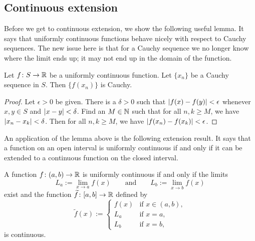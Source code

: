 \subsection{Continuous extension}

Before we get to continuous extension, we show the following useful lemma.
It says that uniformly continuous functions behave nicely with respect
to Cauchy sequences.  The new issue here is that for a Cauchy sequence
we no longer know where the limit ends up; it may not end up in the domain
of the function.

\begin{lemma} \label{unifcauchycauchy:lemma}
Let $f \colon S \to {\mathbb{R}}$ be a uniformly continuous function.  Let
$\{ x_n \}$ be a Cauchy sequence in $S$.  Then $\{ f(x_n) \}$ is Cauchy.
\end{lemma}

\begin{proof}
Let $\epsilon > 0$ be given.  There is a $\delta > 0$ such that
$\left\lvert {f(x)-f(y)} \right\rvert < \epsilon$ whenever $x,y \in S$ and $\left\lvert {x-y} \right\rvert < \delta$.  Find an $M
\in {\mathbb{N}}$ such that for all $n, k \geq M$, we have $\left\lvert {x_n-x_k} \right\rvert < \delta$.
Then for all $n, k \geq M$, we have $\left\lvert {f(x_n)-f(x_k)} \right\rvert < \epsilon$.
\end{proof}

An application of the lemma above is the following extension result.  It says that
a function on an open interval is uniformly continuous if and only if
it can be extended to a continuous function on the closed interval.

\begin{prop} \label{context:prop}
A function $f \colon (a,b) \to {\mathbb{R}}$ is uniformly continuous if and only if
the limits 
\begin{equation*}
L_a := \lim_{x \to a} f(x) \qquad \text{and} \qquad
L_b := \lim_{x \to b} f(x)
\end{equation*}
exist and the function $\widetilde{f} \colon [a,b] \to {\mathbb{R}}$
defined by
\begin{equation*}
\widetilde{f}(x) :=
\begin{cases}
f(x) & \text{if } x \in (a,b), \\
L_a & \text{if } x = a, \\
L_b & \text{if } x = b,
\end{cases}
\end{equation*}
is continuous.
\end{prop}

